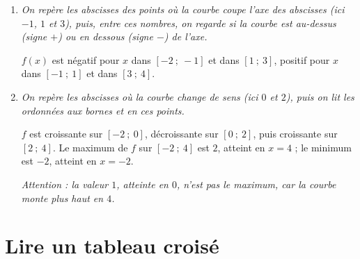 \documentclass[10pt,a4paper]{article}
\begin{document}
\begin{bloc}
\begin{enumerate}[leftmargin=*, start=5]
    \item \textit{On repère les abscisses des points où la courbe coupe l'axe des abscisses (ici \(-1\), \(1\) et \(3\)), puis, entre ces nombres, on regarde si la courbe est au-dessus (signe \(+\)) ou en dessous (signe \(-\)) de l'axe.}

    \begin{center}
    \end{center}
    \(f(x)\) est négatif pour \(x\) dans \([-2\ ;\ -1]\) et dans \([1\ ;\ 3]\), positif pour \(x\) dans \([-1\ ;\ 1]\) et dans \([3\ ;\ 4]\).
    \item \textit{On repère les abscisses où la courbe change de sens (ici \(0\) et \(2\)), puis on lit les ordonnées aux bornes et en ces points.}

    \begin{center}
    \end{center}
    \(f\) est croissante sur \([-2\ ;\ 0]\), décroissante sur \([0\ ;\ 2]\), puis croissante sur \([2\ ;\ 4]\). Le maximum de \(f\) sur \([-2\ ;\ 4]\) est \(2\), atteint en \(x=4\) ; le minimum est \(-2\), atteint en \(x=-2\).

    \textit{Attention : la valeur \(1\), atteinte en \(0\), n'est pas le maximum, car la courbe monte plus haut en \(4\).}
\end{enumerate}
\end{bloc}

\section{Lire un tableau croisé} \label{annexe-tableaux-croises}
\end{document}
